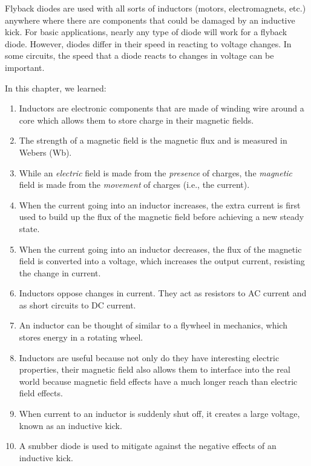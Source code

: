 Flyback diodes are used with all sorts of inductors (motors, electromagnets, etc.) anywhere where there are components that could be damaged by an inductive kick.
For basic applications, nearly any type of diode will work for a flyback diode.
However, diodes differ in their speed in reacting to voltage changes.
In some circuits, the speed that a diode reacts to changes in voltage can be important.

\reviewsection

In this chapter, we learned:

\begin{enumerate}
\item Inductors are electronic components that are made of winding wire around a core which allows them to store charge in their magnetic fields.
\item The strength of a magnetic field is the magnetic flux and is measured in Webers (Wb).
\item While an \emph{electric} field is made from the \emph{presence} of charges, the \emph{magnetic} field is made from the \emph{movement} of charges (i.e., the current).
\item When the current going into an inductor increases, the extra current is first used to build up the flux of the magnetic field before achieving a new steady state.
\item When the current going into an inductor decreases, the flux of the magnetic field is converted into a voltage, which increases the output current, resisting the change in current.
\item Inductors oppose changes in current.  They act as resistors to AC current and as short circuits to DC current.
\item An inductor can be thought of similar to a flywheel in mechanics, which stores energy in a rotating wheel.
\item Inductors are useful because not only do they have interesting electric properties, their magnetic field also allows them to interface into the real world because magnetic field effects have a much longer reach than electric field effects.
\item When current to an inductor is suddenly shut off, it creates a large voltage, known as an inductive kick.
\item A snubber diode is used to mitigate against the negative effects of an inductive kick.
\end{enumerate}

\applysection


